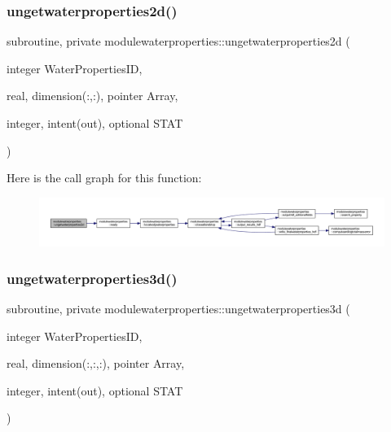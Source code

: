 \subsubsection{\texorpdfstring{ungetwaterproperties2d()}{ungetwaterproperties2d()}}
{\footnotesize\ttfamily subroutine, private modulewaterproperties\+::ungetwaterproperties2d (\begin{DoxyParamCaption}\item[{integer}]{Water\+Properties\+ID,  }\item[{real, dimension(\+:,\+:), pointer}]{Array,  }\item[{integer, intent(out), optional}]{S\+T\+AT }\end{DoxyParamCaption})\hspace{0.3cm}{\ttfamily [private]}}

Here is the call graph for this function\+:\nopagebreak
\begin{figure}[H]
\begin{center}
\leavevmode
\includegraphics[width=350pt]{namespacemodulewaterproperties_ab8a50929e1e5fe0ebe591654fa4fd52f_cgraph}
\end{center}
\end{figure}
\mbox{\label{namespacemodulewaterproperties_ab4f28352125d7c0b068c093e4ffb88dd}} 
\subsubsection{\texorpdfstring{ungetwaterproperties3d()}{ungetwaterproperties3d()}}
{\footnotesize\ttfamily subroutine, private modulewaterproperties\+::ungetwaterproperties3d (\begin{DoxyParamCaption}\item[{integer}]{Water\+Properties\+ID,  }\item[{real, dimension(\+:,\+:,\+:), pointer}]{Array,  }\item[{integer, intent(out), optional}]{S\+T\+AT }\end{DoxyParamCaption})\hspace{0.3cm}{\ttfamily [private]}}

